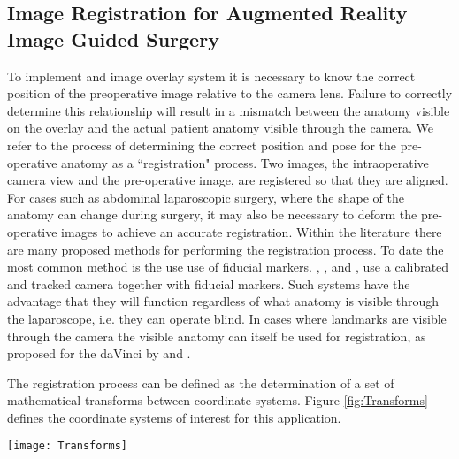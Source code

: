 \subsection{Image Registration for Augmented Reality Image Guided Surgery}
To implement and image overlay system it is necessary to know the correct
position of the preoperative image relative to the camera lens. Failure to correctly determine this
relationship will result in a mismatch between the anatomy visible on the overlay and the 
actual patient anatomy visible through the camera. We refer to the process of 
determining the correct position and pose for the pre-operative anatomy as a ``registration" 
process. Two images, the intraoperative camera view and the
pre-operative image, are registered so that they are aligned. 
For cases such as abdominal laparoscopic surgery,
where the shape of the anatomy can change during surgery, it may also be necessary to deform the
pre-operative images to achieve an accurate registration. Within the literature there are many
proposed methods for performing the registration process. To date the most common method
is the use use of fiducial markers. \cite{pap191}, \cite{pap190}, \cite{pap188} 
and \cite{pap210}, use a calibrated and tracked camera together with fiducial markers.
Such systems have the advantage that they 
will function regardless of what anatomy is visible through the laparoscope, i.e. they 
can operate blind.
In cases where landmarks are visible through the camera the visible anatomy can itself be
used for registration, as
proposed for the daVinci by \cite{pap208} and \cite{pap203}.

The registration process can be defined as the determination of a set of 
mathematical transforms between coordinate systems. Figure
\ref{fig:Transforms} defines the coordinate systems of interest for this
application. 
\begin{figure*}[ht]
\begin{center}
\texttt{[image: Transforms]}
\end{center}
\caption{\label{fig:Transforms}Any image guided surgery system is defined by a 
set of geometric transforms between different coordinate systems. The figure above 
defines the coordinate systems relevant here. The transforms between individual 
coordinate systems are combined to give the transform between the preoperative MRI
($CS_{MRI}$) and the laparoscope's video screen ($CS_{Screen}$). 
}
\end{figure*}

